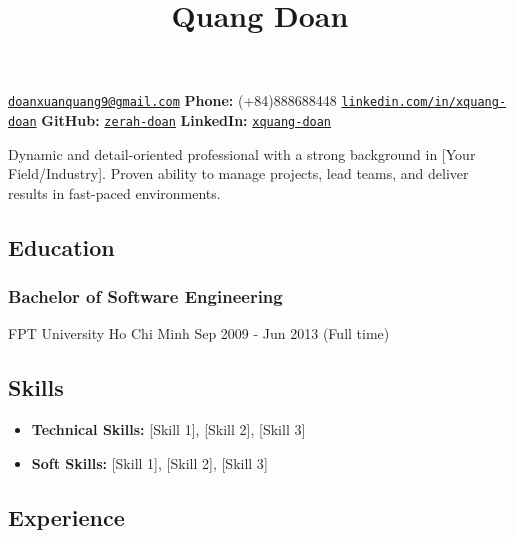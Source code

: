 \documentclass[11pt,a4paper]{article}
\title{\textcolor{devblue}{\large Quang Doan}}
\author{}
\date{}
\providecommand{\tightlist}{%
  \setlength{\itemsep}{0pt}\setlength{\parskip}{0pt}}
\begin{document}
\maketitle

\vspace{-1em}
\noindent\href{mailto:doanxuanquang9@gmail.com}{\texttt{doanxuanquang9@gmail.com}} \hspace{1em}
\textbf{Phone:} (+84)888688448 \hspace{1em}
\href{https://linkedin.com/in/xquang-doan}{\texttt{linkedin.com/in/xquang-doan}} \hspace{1em}
\textbf{GitHub:} \href{https://github.com/zerah-doan}{\texttt{zerah-doan}} \hspace{1em}
\textbf{LinkedIn:} \href{https://linkedin.com/in/xquang-doan}{\texttt{xquang-doan}}

\vspace{1em}

Dynamic and detail-oriented professional with a strong background in
{[}Your Field/Industry{]}. Proven ability to manage projects, lead
teams, and deliver results in fast-paced environments.

\subsection{Education}\label{education}

\subsubsection{Bachelor of Software
Engineering}\label{bachelor-of-software-engineering}

FPT University Ho Chi Minh Sep 2009 - Jun 2013 (Full time)

\subsection{Skills}\label{skills}

\begin{itemize}
\tightlist
\item
  \textbf{Technical Skills:} {[}Skill 1{]}, {[}Skill 2{]}, {[}Skill 3{]}
\item
  \textbf{Soft Skills:} {[}Skill 1{]}, {[}Skill 2{]}, {[}Skill 3{]}
\end{itemize}

\subsection{Experience}\label{experience}
\end{document}
